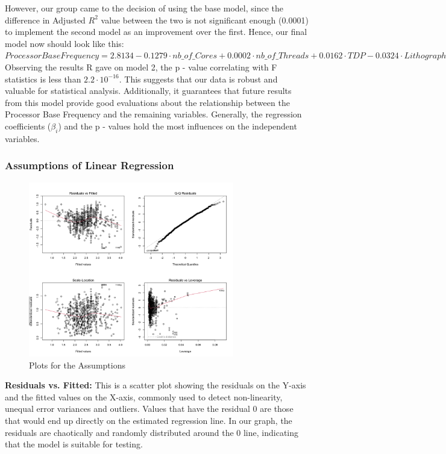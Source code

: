 However, our group came to the decision of using the base model, since the difference in Adjusted $R^2$ value between the two is not significant enough (0.0001) to implement the second model as an improvement over the first. Hence, our final model now should look like this:\\

$Processor Base Frequency = 2.8134 - 0.1279 \cdot nb\_of\_Cores + 0.0002 \cdot nb\_of\_Threads + 0.0162 \cdot TDP - 0.0324 \cdot Lithography$ \\

Observing the results R gave on model 2, the p - value correlating with F statistics is less than $2.2 \cdot 10^{-16}$. This suggests that our data is robust and valuable for statistical analysis. Additionally, it guarantees that future results from this model provide good evaluations about the relationship between the Processor Base Frequency and the remaining variables. Generally, the regression coefficients ($\beta_i$) and the p - values hold the most influences on the independent variables. 

\subsubsection{Assumptions of Linear Regression}

\begin{figure}[H]
    \centering
    \includegraphics[width=0.8\textwidth]{graphics/assumption_graph.png}
    \caption{Plots for the Assumptions}
    \label{fig:assumption_graph}
\end{figure}

\textbf{Residuals vs. Fitted:} This is a scatter plot showing the residuals on the Y-axis and the fitted values on the X-axis, commonly used to detect non-linearity, unequal error variances and outliers. Values that have the residual 0 are those that would end up directly on the estimated regression line. In our graph, the residuals are chaotically and randomly distributed around the 0 line, indicating that the model is suitable for testing. \\

